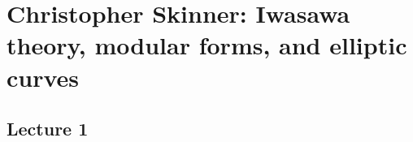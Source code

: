 \newpage
\section{Christopher Skinner: Iwasawa theory, modular forms, and elliptic curves}
\subsection{Lecture 1}